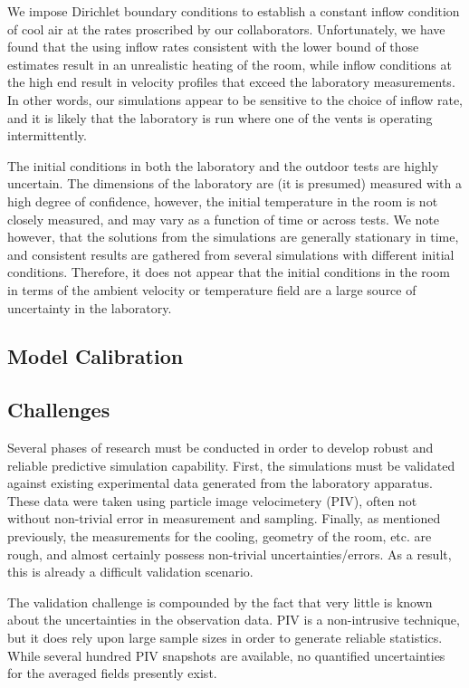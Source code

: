 We impose Dirichlet boundary conditions to establish a constant inflow
condition of cool air at the rates proscribed by our
collaborators. Unfortunately, we have found that the using inflow rates
consistent with the lower bound of those estimates result in an
unrealistic heating of the room, while inflow conditions at the high end
result in velocity profiles that exceed the laboratory measurements. In
other words, our simulations appear to be sensitive to the choice of
inflow rate, and it is likely that the laboratory is run where one of
the vents is operating intermittently. 

The initial conditions in both the laboratory and the outdoor
tests are highly uncertain. The dimensions of the laboratory are
(it is presumed) measured with a high degree of confidence, however, the
initial temperature 
in the room is not closely measured, and may vary as a function of
time or across tests. We note however, that the solutions from the simulations are
generally stationary in time, and consistent results are gathered from several
simulations with different initial conditions. Therefore, it does not
appear that the initial conditions in the room in terms of the ambient
velocity or temperature field are a large source of uncertainty in the
laboratory.

\subsection{Model Calibration}

%
% 


\subsection{Challenges}

Several phases of research must be conducted in order to develop robust
and reliable predictive simulation capability. First, the simulations
must be validated against existing experimental data generated from the
laboratory apparatus. These data were taken using particle image
velocimetery (PIV), often not without non-trivial error in measurement and
sampling. Finally, as mentioned previously, the measurements for the
cooling, geometry of the room, etc. are rough, and almost certainly
possess non-trivial uncertainties/errors. As a result, this is already a
difficult validation scenario. 

The validation challenge is compounded by the fact that very little is
known about the uncertainties in the observation data. PIV is a
non-intrusive technique, but it does rely upon large sample sizes in
order to generate reliable statistics. While several hundred PIV
snapshots are available, no quantified uncertainties for the averaged fields
presently exist.  

